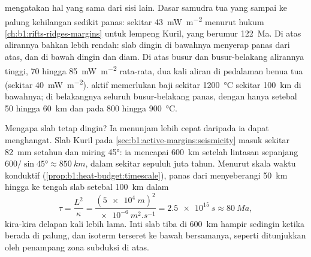 \begin{omfigure}
\par{}
\label{fig:b1:active-margins:profiles}
\end{omfigure}

 mengatakan hal yang sama dari sisi lain. Dasar samudra tua yang sampai ke palung kehilangan sedikit panas: sekitar \qty{43}{mW.m^{-2}} menurut hukum \cref{ch:b1:rifts-ridges-margins} untuk lempeng Kuril, yang berumur \qty{122}{Ma}. Di atas  alirannya bahkan lebih rendah: slab dingin di bawahnya menyerap panas dari atas, dan  di bawah  dingin dan diam. Di atas busur dan busur-belakang alirannya tinggi, 70 hingga \qty{85}{mW.m^{-2}} rata-rata, dua kali aliran di pedalaman benua tua (sekitar \qty{40}{mW.m^{-2}}).  aktif memerlukan baji  sekitar \qty{1200}{\celsius} sekitar \qty{100}{km} di bawahnya; di belakangnya seluruh busur-belakang panas, dengan  hanya setebal 50 hingga \qty{60}{km} dan  pada 800 hingga \qty{900}{\celsius}.

Mengapa slab tetap dingin? Ia menunjam lebih cepat daripada ia dapat menghangat. Slab Kuril pada \cref{sec:b1:active-margins:seismicity} masuk sekitar \qty{82}{mm} setahun dan miring \ang{45}: ia mencapai \qty{600}{km} setelah lintasan sepanjang $600/\sin\ang{45} \approx \qty{850}{km}$, dalam sekitar sepuluh juta tahun. Menurut skala waktu konduktif (\cref{prop:b1:heat-budget:timescale}), panas dari  menyeberangi \qty{50}{km} hingga ke tengah slab setebal \qty{100}{km} dalam
\[
  \tau = \frac{L^2}{\kappa} = \frac{(\qty{5e4}{m})^2}{\qty{e-6}{m^2.s^{-1}}}
  = \qty{2.5e15}{s} \approx \qty{80}{Ma},
\]
kira-kira delapan kali lebih lama. Inti slab tiba di \qty{600}{km} hampir sedingin ketika berada di palung, dan isoterm terseret ke bawah bersamanya, seperti ditunjukkan oleh penampang zona subduksi di atas.


